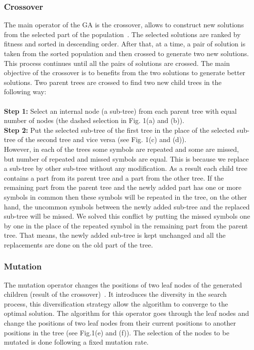 \documentclass[preprint,12pt]{elsarticle}
\begin{document}
\subsubsection{Crossover}
The main operator of the GA is the crossover, allows to construct new solutions from the selected part of the population~\cite{osa14}. The selected solutions are ranked by fitness and sorted in descending order. After that, at a time, a pair of solution is taken from the sorted population and then crossed to generate two new solutions. This process continues until all the pairs of solutions are crossed. The main objective of the crossover is to benefits from the two solutions  to generate better solutions.
Two parent trees are crossed to find two new child trees in the following way:\\\\
\textbf{Step 1: }Select an internal node (a sub-tree) from each parent tree with equal number of nodes (the dashed selection in Fig. 1(a) and (b)). \\
\textbf{Step 2:} Put the selected sub-tree of the first tree in the place of the selected sub-tree of the second tree and vice versa (see Fig. 1(c) and (d)).\\

However, in each of the trees some symbols are repeated and some are missed, but number of repeated and missed symbols are equal. This is because we replace a sub-tree by other sub-tree without any modification. As a result each child tree contains a part from its parent tree and a part from the other tree. If the remaining part from the parent tree and the newly added part has one or more  symbols in common then these symbols will be repeated in the tree, on the other hand, the uncommon symbols between the newly added sub-tree and  the replaced sub-tree will be missed.  We solved this conflict by putting the missed symbols one by one in the place of the repeated symbol in the remaining part from the parent tree. That means, the newly added sub-tree is kept unchanged and all the replacements are done on the old part of the tree.

\subsubsection{Mutation}
The mutation operator changes the positions of two leaf nodes of the generated children (result of the crossover)~\cite{muhlenbein1992genetic}. It introduces the diversity in the search process, this diversification strategy allow the algorithm to converge to the optimal solution. The algorithm for this operator goes through the leaf nodes and change the positions of two leaf nodes from their current positions to another positions in the tree (see Fig.1(e) and (f)). The selection of the nodes to be mutated is done following a fixed mutation rate.
\end{document}
